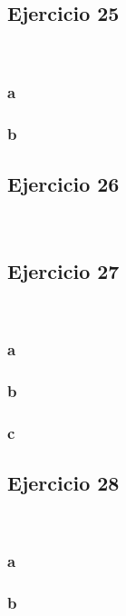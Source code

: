 \documentclass{article}
\begin{document}
\subsection*{Ejercicio 25}

\

\subsubsection*{a}

\subsubsection*{b}

\subsection*{Ejercicio 26}

\

\subsection*{Ejercicio 27}

\

\subsubsection*{a}

\subsubsection*{b}

\subsubsection*{c}

\subsection*{Ejercicio 28}

\

\subsubsection*{a}

\subsubsection*{b}
\end{document}
